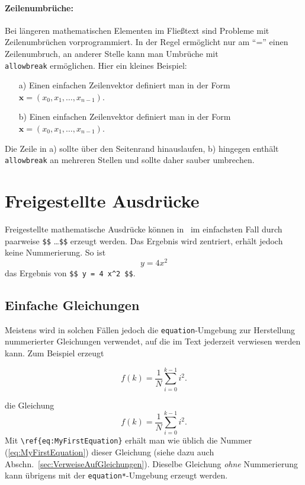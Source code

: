 \paragraph{Zeilenumbrüche:}
Bei längeren mathematischen Elementen im Fließtext sind Probleme mit Zeilenumbrüchen
vorprogrammiert. In der Regel ermöglicht \latex nur am "`="' einen Zeilenumbruch,
an anderer Stelle kann man Umbrüche mit \texttt{\\allowbreak} ermöglichen. 
Hier ein kleines Beispiel:
%
\begin{itemize}
\item[a)] Einen einfachen Zeilenvektor definiert man in der Form 
		$\boldsymbol{x} = (x_0, x_1, \ldots, x_{n-1})$.
\item[b)] Einen einfachen Zeilenvektor definiert man in der Form 
	$\boldsymbol{x} = (x_0,\allowbreak x_1,\allowbreak\ldots,\allowbreak x_{n-1})$.
\end{itemize}
Die Zeile in a) sollte über den Seitenrand hinauslaufen, b) hingegen enthält
\texttt{\\allowbreak} an mehreren Stellen und sollte daher sauber umbrechen.


\section{Freigestellte Ausdrücke}

Freigestellte mathematische Ausdrücke können in \latex\ im einfachsten Fall durch paarweise 
\verb!$$! \ldots \verb!$$! erzeugt werden. Das Ergebnis wird zentriert, erhält jedoch keine 
Nummerierung. So ist \zB\ $$ y = 4 x^2 $$ das Ergebnis von \verb!$$ y = 4 x^2 $$!.


\subsection{Einfache Gleichungen} 

Meistens wird in solchen Fällen jedoch die \texttt{equation}-Umgebung zur Herstellung nummerierter 
Gleichungen verwendet, auf die im Text jederzeit verwiesen werden kann. Zum Beispiel erzeugt
%
\begin{LaTeXCode}[numbers=none]
\begin{equation}
  f(k) = \frac{1}{N} \sum_{i=0}^{k-1} i^2 . 
  \label{eq:MyFirstEquation}
\end{equation}
\end{LaTeXCode}
%
die Gleichung
%
\begin{equation}
  f(k) = \frac{1}{N} \sum_{i=0}^{k-1} i^2 . 
\label{eq:MyFirstEquation}
\end{equation}
%
Mit \verb!\ref{eq:MyFirstEquation}! erhält man wie üblich die Nummer (\ref{eq:MyFirstEquation}) dieser Gleichung (siehe dazu auch Abschn.\ \ref{sec:VerweiseAufGleichungen}). 
Dieselbe Gleichung \emph{ohne} Nummerierung kann übrigens mit der \texttt{equation*}-Umgebung erzeugt werden.




